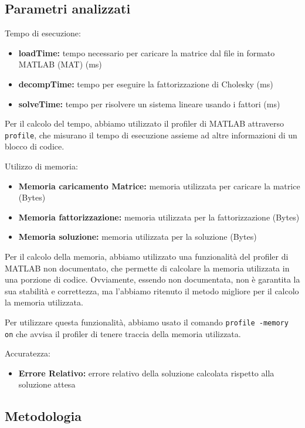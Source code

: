 \subsection{Parametri analizzati}

Tempo di esecuzione:
\begin{itemize}
    \item \textbf{loadTime:} tempo necessario per caricare la matrice dal file in formato MATLAB (MAT) (ms)
    \item \textbf{decompTime:} tempo per eseguire la fattorizzazione di Cholesky (ms)
    \item \textbf{solveTime:} tempo per risolvere un sistema lineare usando i fattori (ms)
\end{itemize}

Per il calcolo del tempo, abbiamo utilizzato il profiler di MATLAB attraverso \texttt{profile},
che misurano il tempo di esecuzione assieme ad altre informazioni di un blocco di codice.

Utilizzo di memoria:
\begin{itemize}
    \item \textbf{Memoria caricamento Matrice:} memoria utilizzata per caricare la matrice (Bytes)
    \item \textbf{Memoria fattorizzazione:} memoria utilizzata per la fattorizzazione (Bytes)
    \item \textbf{Memoria soluzione:} memoria utilizzata per la soluzione (Bytes)
\end{itemize}

Per il calcolo della memoria, abbiamo utilizzato una funzionalità del profiler di MATLAB non documentato,
che permette di calcolare la memoria utilizzata in una porzione di codice. Ovviamente, essendo non documentata, non
è garantita la sua stabilità e correttezza, ma l'abbiamo ritenuto il metodo migliore per il calcolo la memoria
utilizzata.

Per utilizzare questa funzionalità, abbiamo usato il comando \texttt{profile -memory on} che avvisa il profiler di tenere traccia
della memoria utilizzata.

Accuratezza:
\begin{itemize}
    \item \textbf{Errore Relativo:} errore relativo della soluzione calcolata rispetto alla soluzione attesa
\end{itemize}

\subsection{Metodologia}

